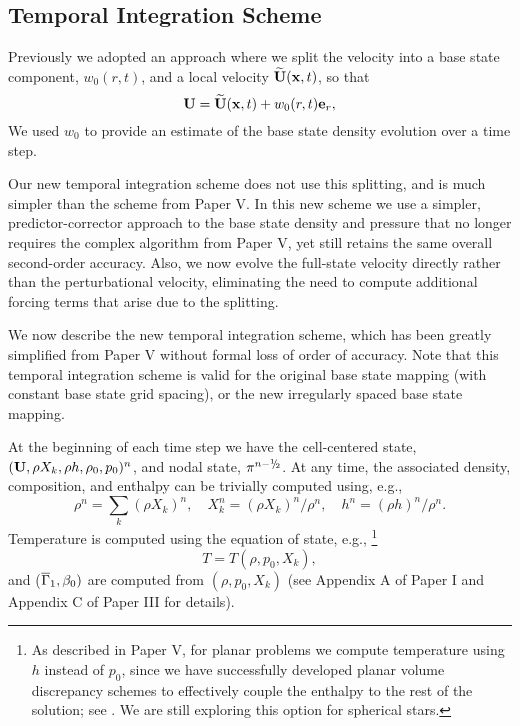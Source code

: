 \subsection{Temporal Integration Scheme}\label{Sec:Temporal Integration Scheme}
Previously we adopted an approach where we split the velocity into a base state component, $w_0(r,t)$, 
and a local velocity $\widetilde{{\bf{U}}}({\bf{x}},t)$, so that
\begin{equation}
\Ub = \Ubt(\xb,t) + w_0(r,t)\eb_r,
\end{equation}
We used $w_0$ to provide an estimate of the base state density evolution over a time step.

Our new temporal integration scheme does not use this splitting, and is much simpler than the scheme from Paper V.
In this new scheme we use a simpler, predictor-corrector approach to the base state density and pressure that no longer requires the complex algorithm from Paper V, yet still retains the same overall second-order accuracy.
Also, we now evolve the full-state velocity directly rather than the perturbational velocity, eliminating the need to compute additional forcing terms that arise due to the splitting.

We now describe the new temporal integration scheme, which has been greatly simplified
from Paper V without formal loss of order of accuracy.
Note that this temporal integration scheme is valid for the original base state mapping (with constant base state grid spacing), or the new irregularly spaced base state mapping.

At the beginning of each time step we have the cell-centered state,
$({\bf{U}},\rho X_k,\rho h,\rho_0,p_0)^n$, and nodal state, $\pi^{n-\myhalf}$.
At any time, the associated density, composition, and enthalpy can be trivially computed using, e.g.,
\begin{equation}
\rho^n = \sum_k(\rho X_k)^n, \quad
X_k^n = (\rho X_k)^n / \rho^n, \quad
h^n = (\rho h)^n / \rho^n.
\end{equation}
Temperature is computed using the equation of state, e.g.,
\footnote{As described in Paper V, for planar problems we compute temperature using $h$ instead of $p_0$, since we have successfully developed planar volume discrepancy schemes to effectively couple the enthalpy to the rest of the solution; see \cite{XRB_I}.  We are still exploring this option for spherical stars.}
\begin{equation}
T = T(\rho,p_0,X_k),
\end{equation}
and ($\overline{\Gamma}_1,\beta_0)$ are computed from $(\rho,p_0,X_k)$ (see Appendix A of Paper I and Appendix C of Paper III for details).

